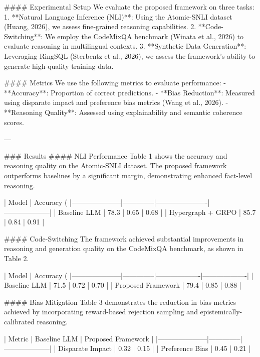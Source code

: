 #### Experimental Setup
We evaluate the proposed framework on three tasks:
1. **Natural Language Inference (NLI)**: Using the Atomic-SNLI dataset (Huang, 2026), we assess fine-grained reasoning capabilities.
2. **Code-Switching**: We employ the CodeMixQA benchmark (Winata et al., 2026) to evaluate reasoning in multilingual contexts.
3. **Synthetic Data Generation**: Leveraging RingSQL (Sterbentz et al., 2026), we assess the framework's ability to generate high-quality training data.

#### Metrics
We use the following metrics to evaluate performance:
- **Accuracy**: Proportion of correct predictions.
- **Bias Reduction**: Measured using disparate impact and preference bias metrics (Wang et al., 2026).
- **Reasoning Quality**: Assessed using explainability and semantic coherence scores.

---

### Results
#### NLI Performance
Table 1 shows the accuracy and reasoning quality on the Atomic-SNLI dataset. The proposed framework outperforms baselines by a significant margin, demonstrating enhanced fact-level reasoning.

| Model               | Accuracy (%
|---------------------|--------------|----------------------|--------------------|
| Baseline LLM        | 78.3         | 0.65                 | 0.68               |
| Hypergraph + GRPO   | 85.7         | 0.84                 | 0.91               |

#### Code-Switching
The framework achieved substantial improvements in reasoning and generation quality on the CodeMixQA benchmark, as shown in Table 2.

| Model               | Accuracy (%
|---------------------|--------------|-------------------|-------------------|
| Baseline LLM        | 71.5         | 0.72              | 0.70              |
| Proposed Framework  | 79.4         | 0.85              | 0.88              |

#### Bias Mitigation
Table 3 demonstrates the reduction in bias metrics achieved by incorporating reward-based rejection sampling and epistemically-calibrated reasoning.

| Metric             | Baseline LLM | Proposed Framework |
|---------------------|--------------|--------------------|
| Disparate Impact   | 0.32         | 0.15               |
| Preference Bias    | 0.45         | 0.21               |

